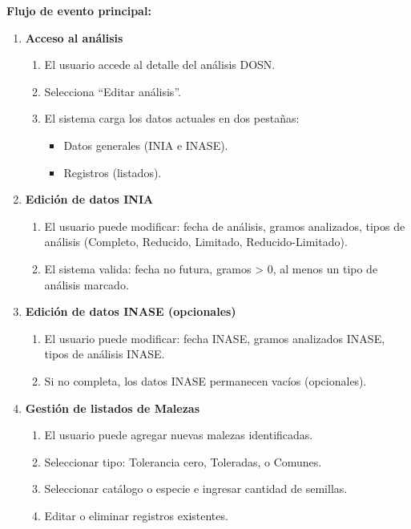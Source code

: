 \vspace{0.5em}
\noindent\textbf{Flujo de evento principal:}
\begin{enumerate}[nosep]
    \item \textbf{Acceso al análisis}
    \begin{enumerate}[nosep]
        \item El usuario accede al detalle del análisis DOSN.
        \item Selecciona ``Editar análisis''.
        \item El sistema carga los datos actuales en dos pestañas:
        \begin{itemize}[nosep]
            \item Datos generales (INIA e INASE).
            \item Registros (listados).
        \end{itemize}
    \end{enumerate}

    \item \textbf{Edición de datos INIA}
    \begin{enumerate}[nosep]
        \item El usuario puede modificar: fecha de análisis, gramos analizados, tipos de análisis (Completo, Reducido, Limitado, Reducido-Limitado).
        \item El sistema valida: fecha no futura, gramos > 0, al menos un tipo de análisis marcado.
    \end{enumerate}

    \item \textbf{Edición de datos INASE (opcionales)}
    \begin{enumerate}[nosep]
        \item El usuario puede modificar: fecha INASE, gramos analizados INASE, tipos de análisis INASE.
        \item Si no completa, los datos INASE permanecen vacíos (opcionales).
    \end{enumerate}

    \item \textbf{Gestión de listados de Malezas}
    \begin{enumerate}[nosep]
        \item El usuario puede agregar nuevas malezas identificadas.
        \item Seleccionar tipo: Tolerancia cero, Toleradas, o Comunes.
        \item Seleccionar catálogo o especie e ingresar cantidad de semillas.
        \item Editar o eliminar registros existentes.
    \end{enumerate}


\end{enumerate}
